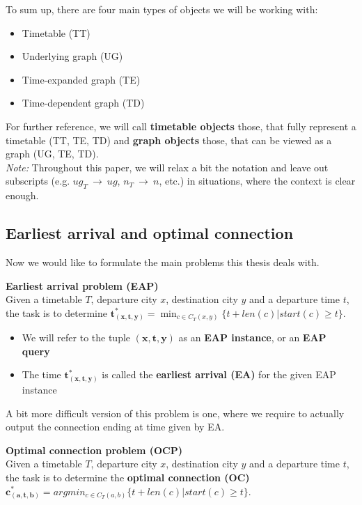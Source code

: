 	\noindent To sum up, there are four main types of objects we will be working with:
	\begin{itemize}
		\item Timetable (TT)
		\item Underlying graph (UG)
		\item Time-expanded graph (TE)
		\item Time-dependent graph (TD)
	\end{itemize}
	\hspace*{\fill}
	
	
	\noindent For further reference, we will call \textbf{timetable objects} those, that fully represent a timetable (TT, TE, TD) and \textbf{graph objects} those, that can be viewed as a graph (UG, TE, TD). \\
	
	\noindent \textit{Note:} Throughout this paper, we will relax a bit the notation and leave out subscripts (e.g. $ug_{T}~\rightarrow~ug$, $n_{T}~\rightarrow~n$, etc.) in situations, where the context is clear enough. 

\subsection{Earliest arrival and optimal connection}

	Now we would like to formulate the main problems this thesis deals with.
	
	\begin{definition}
		\textbf{Earliest arrival problem (EAP)}\\
        Given a timetable $T$, departure city $x$, destination city $y$ and a departure time $t$, the task is to determine $\bm{t_{(x, t, y)}^{*}} = \min_{c \in C_{T}(x, y)} \{t + len(c)|start(c) \geq t\}$. 
        \begin{itemize}
        	\item We will refer to the tuple $\bm{(x, t, y)}$ as an \textbf{EAP instance}, or an \textbf{EAP query}
        	\item The time $\bm{t_{(x, t, y)}^{*}}$ is called the \textbf{earliest arrival (EA)} for the given EAP instance
        \end{itemize}
	\end{definition}
	
	\noindent A bit more difficult version of this problem is one, where we require to actually output the connection ending at time given by EA.

	\begin{definition}
		\textbf{Optimal connection problem (OCP)}\\
        Given a timetable $T$, departure city $x$, destination city $y$ and a departure time $t$, the task is to determine the \textbf{optimal connection (OC)} $\bm{c_{(a, t, b)}^{*}} = argmin_{c \in C_{T}(a, b)} \{t + len(c)|start(c) \geq t\}$. 
	\end{definition}
	
